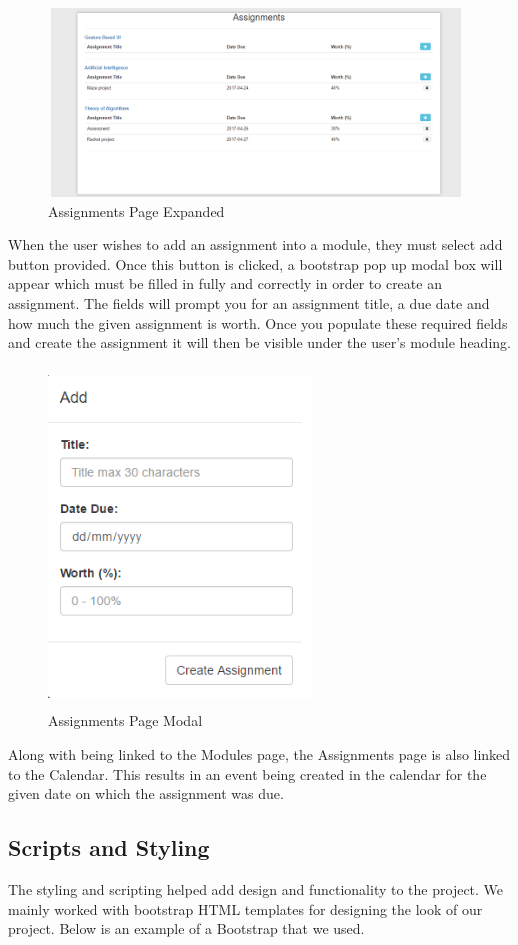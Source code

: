 \begin{figure}[h]
\centering
\includegraphics[width=11cm, height=5cm]{img/Assignments1}
\caption{Assignments Page Expanded}
\end{figure}

When the user wishes to add an assignment into a module, they must select add button provided. Once this button is clicked, a bootstrap pop up modal box will appear which must be filled in fully and correctly in order to create an assignment. The fields will prompt you for an assignment title, a due date and how much the given assignment is worth. Once you populate these required fields and create the assignment it will then be visible under the user’s module heading.

\begin{figure}[h]
\centering
\includegraphics[width=7cm, height=9cm]{img/AddAssignment}
\caption{Assignments Page Modal}
\end{figure}
\newpage
Along with being linked to the Modules page, the Assignments page is also linked to the Calendar. This results in an event being created in the calendar for the given date on which the assignment was due. 


\subsection{Scripts and Styling}
The styling and scripting helped add design and functionality to the project. We mainly worked with bootstrap HTML templates for designing the look of our project. Below is an example of a Bootstrap that we used.

